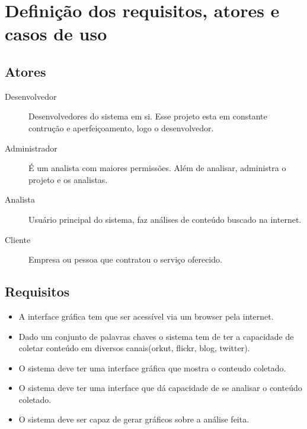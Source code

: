 \section{Definição dos requisitos, atores e casos de uso}

\subsection{Atores}
\begin{description}
    \item[Desenvolvedor] Desenvolvedores do sistema em si. Esse
    projeto esta em constante contrução e aperfeiçoamento, logo o
    desenvolvedor.

    \item[Administrador] É um analista com maiores permissões. Além de
    analisar, administra o projeto e os analistas.

    \item[Analista] Usuário principal do sistema, faz análises de
    conteúdo buscado na internet.

    \item[Cliente] Empresa ou pessoa que contratou o serviço
    oferecido.
\end{description}


\subsection{Requisitos}
\begin{itemize}
    \item A interface gráfica tem que ser acessível via um browser
    pela internet.
    \item Dado um conjunto de palavras chaves o sistema tem de ter a
    capacidade de coletar conteúdo em diversos canais(orkut, flickr,
            blog, twitter).
    \item O sistema deve ter uma interface gráfica que mostra o
    conteudo coletado.
    \item O sistema deve ter uma interface que dá capacidade de se
    analisar o conteúdo coletado.
    \item O sistema deve ser capaz de gerar gráficos sobre a análise
    feita.
\end{itemize}


